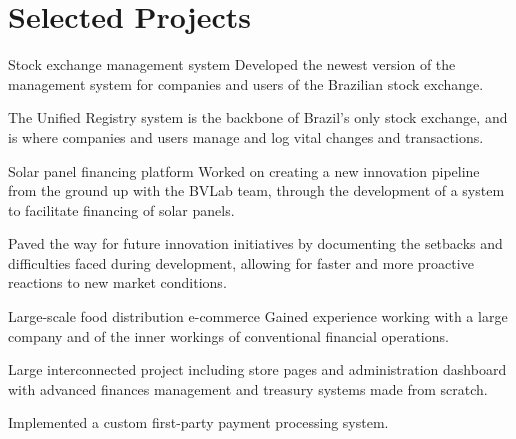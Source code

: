 \section{Selected Projects}

\begin{experience}{Stock exchange management system}{
}
Developed the newest version of the management system for companies and users of the Brazilian stock exchange.

\begin{contribs}
	\item{The Unified Registry system is the backbone of Brazil's only stock exchange, and is where companies and users manage and log vital changes and transactions.}
\end{contribs}
\end{experience}

\begin{experience}{Solar panel financing platform}{
}
Worked on creating a new innovation pipeline from the ground up with the BVLab team, through the development of a system to facilitate financing of solar panels.

\begin{contribs}
	\item{Paved the way for future innovation initiatives by documenting the setbacks and difficulties faced during development, allowing for faster and more proactive reactions to new market conditions.}
\end{contribs}
\end{experience}

\begin{experience}{Large-scale food distribution e-commerce}{
}
Gained experience working with a large company and of the inner workings of conventional financial operations.

\begin{contribs}
	\item{Large interconnected project including store pages and administration dashboard with advanced finances management and treasury systems made from scratch.}
	\item{Implemented a custom first-party payment processing system.}
\end{contribs}
\end{experience}
